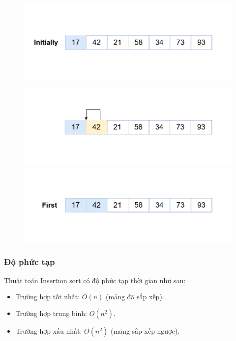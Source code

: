 \begin{figure}[H]
    \centering
    \includegraphics[width=1\linewidth]{img/Insertion sort_sửa đổi/1.png}
    
    \vspace{0.5cm}
    \includegraphics[width=1\linewidth]{img/Insertion sort_sửa đổi/2.png}
    \vspace{0.5cm}
    \includegraphics[width=1\linewidth]{img/Insertion sort_sửa đổi/3.png}
    \vspace{0.5cm}
   
    \label{fig:part1}
\end{figure}





\subsubsection{Độ phức tạp}
Thuật toán Insertion sort có độ phức tạp thời gian như sau:
\begin{itemize}
    \item Trường hợp tốt nhất: $O(n)$ (mảng đã sắp xếp).
    \item Trường hợp trung bình: $O(n^2)$.
    \item Trường hợp xấu nhất: $O(n^2)$ (mảng sắp xếp ngược).
\end{itemize}